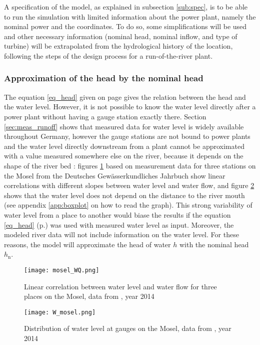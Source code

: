 A specification of the model, as explained in subsection \ref{sub:spec}, is to be able to run the simulation with limited information about the power plant, namely the nominal power and the coordinates. To do so, some simplifications will be used and other necessary information (nominal head, nominal inflow, and type of turbine) will be extrapolated from the hydrological history of the location, following the steps of the design process for a run-of-the-river plant.
\subsubsection{Approximation of the head by the nominal head}

The equation \ref{eq_head} given on page \pageref{eq_head} gives the relation between the head and the water level. However, it is not possible to know the water level directly after a power plant without having a gauge station exactly there. Section \ref{sec:meas_runoff} shows that measured data for water level is widely available throughout Germany, however the gauge stations are not bound to power plants and the water level directly downstream from a plant cannot be approximated with a value measured somewhere else on the river, because it depends on the shape of the river bed : figures \ref{mosel_WQ} based on measurement data for three stations on the Mosel from the Deutsches Gewässerkundliches Jahrbuch show linear correlations with different slopes between water level and water flow, and figure \ref{W_mosel} shows that the water level does not depend on the distance to the river mouth (see appendix \ref{app:boxplot} on how to read the graph). \newline
This strong variability of water level from a place to another would biase the results if the equation \ref{eq_head} (p.\pageref{eq_head}) was used with measured water level as input. Moreover, the modeled river data will not include information on the water level. For these reasons, the model will approximate the head of water $h$ with the nominal head $h_\mathrm{n}$.

\begin{figure}[H]
\centering
\texttt{[image: mosel\_WQ.png]}
\caption[Linear correlation between water level and  water flow for three places on the Mosel]{Linear correlation between water level and water flow for three places on the Mosel, data from \cite{dgj}, year 2014}
\label{mosel_WQ}
\end{figure}


\begin{figure}[H]
\centering
\texttt{[image: W\_mosel.png]}
\caption[Distribution of water level at gauges on the Mosel]{Distribution of water level at gauges on the Mosel, data from \cite{dgj}, year 2014}
\label{W_mosel}
\end{figure}

